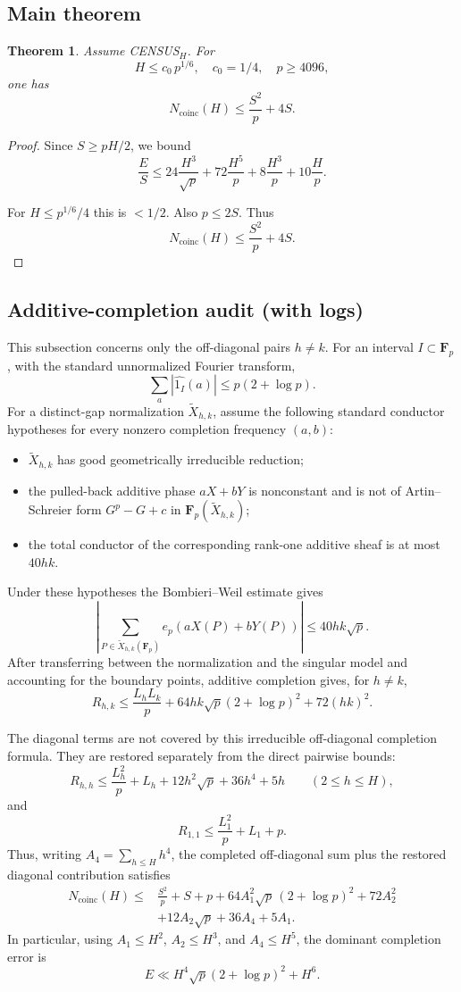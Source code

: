\documentclass[11pt]{article}
\newtheorem{theorem}{Theorem}
\theoremstyle{remark}
\newcommand{\Fp}{\mathbf F_p}
\newcommand{\Ncoinc}{N_{\mathrm{coinc}}}
\begin{document}
\subsection*{Main theorem}

\begin{theorem}
Assume CENSUS$_H$.
For
\[
H \le c_0 \, p^{1/6}, \quad c_0 = 1/4, \quad p \ge 4096,
\]
one has
\[
\boxed{
\Ncoinc(H) \le \frac{S^2}{p} + 4S.
}
\]
\end{theorem}

\begin{proof}
Since $S \ge pH/2$, we bound
\[
\frac{E}{S}
\le 24 \frac{H^3}{\sqrt p}
+ 72 \frac{H^5}{p}
+ 8 \frac{H^3}{p}
+ 10 \frac{H}{p}.
\]

For $H \le p^{1/6}/4$ this is $< 1/2$.
Also $p \le 2S$.
Thus
\[
\Ncoinc(H) \le \frac{S^2}{p} + 4S.
\]
\end{proof}

\subsection*{Additive-completion audit (with logs)}

This subsection concerns only the off-diagonal pairs $h\ne k$.
For an interval $I\subset\Fp$, with the standard unnormalized Fourier
transform,
\[
\sum_a |\widehat{1_I}(a)| \le p(2+\log p).
\]
For a distinct-gap normalization $\widetilde X_{h,k}$, assume the following
standard conductor hypotheses for every nonzero completion frequency
$(a,b)$:
\begin{itemize}
\item $\widetilde X_{h,k}$ has good geometrically irreducible reduction;
\item the pulled-back additive phase $aX+bY$ is nonconstant and is not of
Artin--Schreier form $G^p-G+c$ in $\Fp(\widetilde X_{h,k})$;
\item the total conductor of the corresponding rank-one additive sheaf is
at most $40hk$.
\end{itemize}
Under these hypotheses the Bombieri--Weil estimate gives
\[
\left|\sum_{P\in\widetilde X_{h,k}(\Fp)}
 e_p(aX(P)+bY(P))\right|
\le 40 hk \sqrt p.
\]
After transferring between the normalization and the singular model and
accounting for the boundary points, additive completion gives, for $h\ne k$,
\[
R_{h,k}
\le \frac{L_h L_k}{p}
+ 64 hk \sqrt p (2+\log p)^2
+ 72 (hk)^2.
\]

The diagonal terms are not covered by this irreducible off-diagonal
completion formula.  They are restored separately from the direct pairwise
bounds:
\[
R_{h,h}
\le \frac{L_h^2}{p}
+ L_h
+ 12h^2 \sqrt p
+ 36 h^4
+ 5h
\qquad (2\le h\le H),
\]
and
\[
R_{1,1} \le \frac{L_1^2}{p}+L_1+p.
\]
Thus, writing $A_4=\sum_{h\le H}h^4$, the completed off-diagonal sum plus
the restored diagonal contribution satisfies
\[
\begin{aligned}
\Ncoinc(H)
\le{}& \frac{S^2}{p}+S+p
+64A_1^2\sqrt p\,(2+\log p)^2
+72A_2^2\\
&+12A_2\sqrt p+36A_4+5A_1.
\end{aligned}
\]
In particular, using $A_1\le H^2$, $A_2\le H^3$, and $A_4\le H^5$, the
dominant completion error is
\[
E \ll H^4 \sqrt p (2+\log p)^2+H^6.
\]
\end{document}
